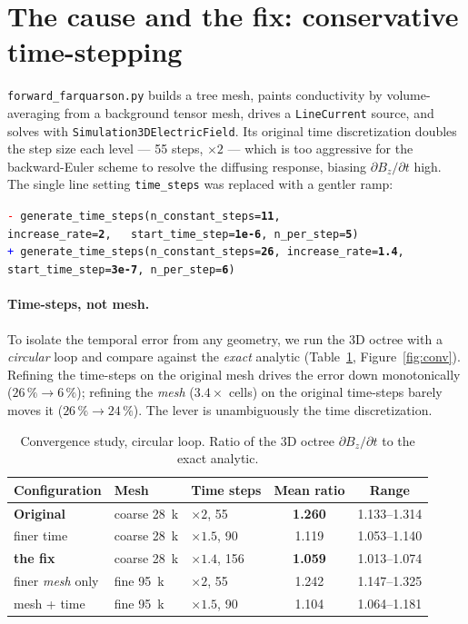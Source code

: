 \documentclass[11pt]{article}
\newcommand{\dbdt}{\partial B_z/\partial t}
\begin{document}
\section{The cause and the fix: conservative time-stepping}
\label{sec:fix}
\texttt{forward\_farquarson.py} builds a tree mesh, paints conductivity by volume-averaging from a
background tensor mesh, drives a \texttt{LineCurrent} source, and solves with
\texttt{Simulation3DElectricField}. Its original time discretization doubles the step size each level ---
55 steps, $\times2$ --- which is too aggressive for the backward-Euler scheme to resolve the diffusing
response, biasing $\dbdt$ high. The single line setting \texttt{time\_steps} was replaced with a gentler
ramp:
\begin{center}\small
\begin{minipage}{0.93\textwidth}
\texttt{\textcolor{red}{- }generate\_time\_steps(n\_constant\_steps=\textbf{11}, increase\_rate=\textbf{2},\ \ \ start\_time\_step=\textbf{1e-6}, n\_per\_step=\textbf{5})}\\
\texttt{\textcolor{blue}{+ }generate\_time\_steps(n\_constant\_steps=\textbf{26}, increase\_rate=\textbf{1.4}, start\_time\_step=\textbf{3e-7}, n\_per\_step=\textbf{6})}
\end{minipage}
\end{center}

\paragraph{Time-steps, not mesh.} To isolate the temporal error from any geometry, we run the 3D octree
with a \emph{circular} loop and compare against the \emph{exact} analytic (Table~\ref{tab:conv},
Figure~\ref{fig:conv}). Refining the time-steps on the original mesh drives the error down monotonically
($26\,\% \to 6\,\%$); refining the \emph{mesh} ($3.4\times$ cells) on the original time-steps barely moves
it ($26\,\% \to 24\,\%$). The lever is unambiguously the time discretization.

\begin{table}[H]\centering\small
\caption{Convergence study, circular loop. Ratio of the 3D octree $\dbdt$ to the exact analytic.}
\label{tab:conv}
\begin{tabular}{lllcc}
\toprule
Configuration & Mesh & Time steps & Mean ratio & Range \\
\midrule
\textbf{Original} & coarse \SI{28}{k} & $\times2$, 55 & \textbf{1.260} & 1.133--1.314 \\
finer time            & coarse \SI{28}{k} & $\times1.5$, 90  & 1.119 & 1.053--1.140 \\
\textbf{the fix}      & coarse \SI{28}{k} & $\times1.4$, 156 & \textbf{1.059} & 1.013--1.074 \\
finer \emph{mesh} only & fine \SI{95}{k}  & $\times2$, 55    & 1.242 & 1.147--1.325 \\
mesh + time           & fine \SI{95}{k}  & $\times1.5$, 90  & 1.104 & 1.064--1.181 \\
\bottomrule
\end{tabular}
\end{table}
\end{document}
